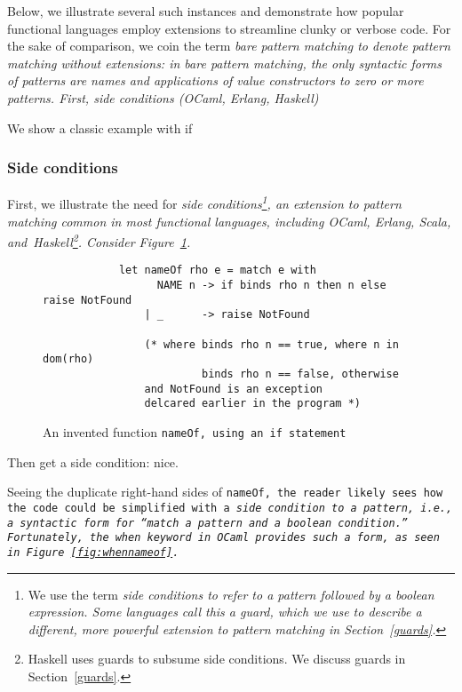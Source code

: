 \documentclass[manuscript,screen,review, 12pt]{acmart}
\begin{document}
\begin{outline}[enumerate]
    Below, we illustrate several such instances and demonstrate how popular
    functional languages employ extensions to streamline clunky or verbose code.
    For the sake of comparison, we coin the term \it{bare pattern matching} to
    denote pattern matching \it{without} extensions: in bare pattern matching,
    the only syntactic forms of patterns are names and applications of value
    constructors to zero or more patterns. 
    \2 First, side conditions (OCaml, Erlang, Haskell)

    \3 We show a classic example with if 

\subsubsection{Side conditions}

    First, we illustrate the need for \it{side conditions}\footnote{We use the
    term \it{side conditions} to refer to a pattern followed by a boolean
    expression. Some languages call this a \it{guard}, which we use to describe
    a different, more powerful extension to pattern matching in
    Section~\ref{guards}.}, an extension to pattern matching common in most
    functional languages, including OCaml, Erlang, Scala,
    and~Haskell\footnote{Haskell uses guards to subsume side conditions. We
    discuss guards in Section~\ref{guards}.}. Consider
    Figure~\ref{fig:ifnameof}. 
    
    \begin{figure}[ht]
        \begin{verbatim}
            let nameOf rho e = match e with 
                  NAME n -> if binds rho n then n else raise NotFound
                | _      -> raise NotFound  

                (* where binds rho n == true, where n in dom(rho)
                         binds rho n == false, otherwise
                and NotFound is an exception 
                delcared earlier in the program *)
            \end{verbatim}    
        \caption{An invented function \tt{nameOf}, using an \tt{if} statement}    
        \label{fig:ifnameof}
    \end{figure}
    
    \3 Then get a side condition: nice. 
    
    Seeing the duplicate right-hand sides of \tt{nameOf}, the reader likely sees
    how the code could be simplified with a \it{side condition} to a pattern,
    i.e., a syntactic form for “match a pattern \it{and} a boolean condition.”
    Fortunately, the \tt{when} keyword in OCaml provides such a form, as seen in
    Figure~\ref{fig:whennameof}.
        

\end{outline}
\end{document}
